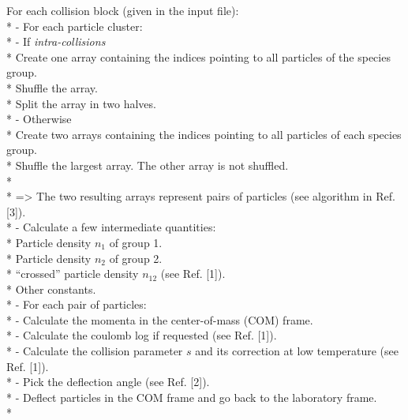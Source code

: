 \documentclass[11pt]{article}
\newlength{\tmp}
\newcommand{\spacing}[1]{\setlength{\tmp}{#1 cm}\addtolength{\tmp}{0.5cm}\hspace*{\tmp}}
\begin{document}
For each collision block (given in the input file):
\vspace{0.3cm}\\*
\spacing{0} - For each particle cluster:
\vspace{0.3cm}\\*
\spacing{1} - If \textit{intra-collisions}
\vspace{0.3cm}\\*
\spacing{2} Create one array containing the indices pointing to all particles of the species group.\\*
\spacing{2} Shuffle the array.\\*
\spacing{2} Split the array in two halves.
\vspace{0.3cm}\\*
\spacing{1} - Otherwise
\vspace{0.3cm}\\*
\spacing{2} Create two arrays containing the indices pointing to all particles of each species group.\\*
\spacing{2} Shuffle the largest array. The other array is not shuffled.\\*\\*
\vspace*{0.4cm}
\spacing{1}=> The two resulting arrays represent pairs of particles (see algorithm in Ref. [3]).\\*
\spacing{1} - Calculate a few intermediate quantities:
\vspace{0.3cm}\\*
\spacing{2} Particle density $n_1$ of group 1.\\*
\spacing{2} Particle density $n_2$  of group 2.\\*
\spacing{2} ``crossed'' particle density $n_{12}$ (see Ref. [1]).\\*
\spacing{2} Other constants.
\vspace{0.3cm}\\*
\spacing{1} - For each pair of particles:
\vspace{0.3cm}\\*
\spacing{2} - Calculate the momenta in the center-of-mass (COM) frame.\\*
\spacing{2} - Calculate the coulomb log if requested (see Ref. [1]).\\*
\spacing{2} - Calculate the collision parameter $s$ and its correction at low temperature (see Ref. [1]).\\*
\spacing{2} - Pick the deflection angle (see Ref. [2]).\\*
\spacing{2} - Deflect particles in the COM frame and go back to the laboratory frame.\\*
\end{document}

